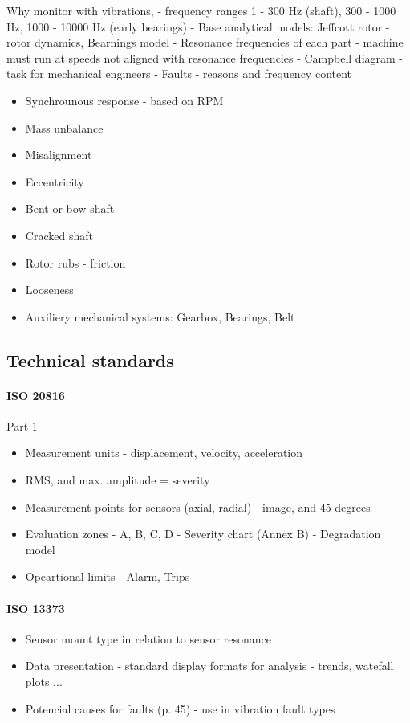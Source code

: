 Why monitor with vibrations,
- frequency ranges 1 - 300 Hz (shaft), 300 - 1000 Hz, 1000 - 10000 Hz (early bearings)
- Base analytical models: Jeffcott rotor - rotor dynamics, Bearnings model
- Resonance frequencies of each part - machine must run at speeds not aligned with resonance frequencies - Campbell diagram - task for mechanical engineers
- Faults - reasons and frequency content


\begin{itemize}
\item Synchrounous response - based on RPM
\item Mass unbalance
\item Misalignment
\item Eccentricity
\item Bent or bow shaft
\item Cracked shaft
\item Rotor rubs - friction
\item Looseness
\item Auxiliery mechanical systems: Gearbox, Bearings, Belt 
\end{itemize}

\cite{lengoc_vibration_1990}
\cite{chen_study_2014}

\subsection{Technical standards}
\paragraph{ISO 20816}
\cite{noauthor_iso_2016}
Part 1
\begin{itemize}
\item Measurement units - displacement, velocity, acceleration
\item RMS, and max. amplitude = severity
\item Measurement points for sensors (axial, radial) - image, and 45 degrees
\item Evaluation zones - A, B, C, D - Severity chart (Annex B) - Degradation model
\item Opeartional limits - Alarm, Trips
\end{itemize}

\paragraph{ISO 13373}
\cite{noauthor_iso_2016}
\cite{noauthor_iso_2016-1}

\cite{jack_d_frequency_nodate}
\begin{itemize}
\item Sensor mount type in relation to sensor resonance
\item Data presentation - standard display formats for analysis - trends, watefall plots ...
\item Potencial causes for faults (p. 45) - use in vibration fault types
\end{itemize}
 
